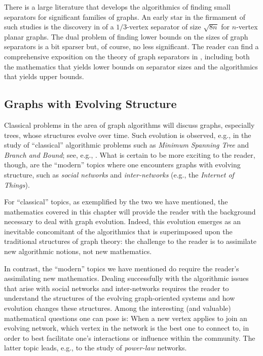\medskip

There is a large literature that develops the algorithmics of finding
small separators for significant families of graphs.  An early star in
the firmament of such studies is the discovery in \cite{LiptonT79} of
a $1/3$-vertex separator of size $\sqrt{8n}$ for $n$-vertex planar graphs.
The dual problem of finding lower bounds on the sizes of graph
separators is a bit sparser but, of course, no less significant.  The
reader can find a comprehensive exposition on the theory of graph
separators in \cite{RosenbergH01}, including both the mathematics that
yields lower bounds on separator sizes and the algorithmics that
yields upper bounds.


\subsection{Graphs with Evolving Structure}
\label{sec:graph-evolve}

Classical problems in the area of graph algorithms will discuss
graphs, especially trees, whose structures evolve over time.  Such
evolution is observed, e.g., in the study of ``classical'' algorithmic
problems such as {\it Minimum Spanning Tree} and {\it Branch and
  Bound}; see, e.g., \cite{CLRS}.  What is certain to be more exciting
to the reader, though, are the ``modern'' topics where one encounters
graphs with evolving structure, such as {\it social networks} and {\it
  inter-networks} (e.g., the {\it Internet of Things}).

For ``classical'' topics, as exemplified by the two we have mentioned,
the mathematics covered in this chapter will provide the reader with
the background necessary to deal with graph evolution.  Indeed, this
evolution emerges as an inevitable concomitant of the algorithmics
that is superimposed upon the traditional structures of graph theory:
the challenge to the reader is to assimilate new algorithmic notions,
not new mathematics.

In contrast, the ``modern'' topics we have mentioned do require the
reader's assimilating new mathematics.  Dealing successfully with the
algorithmic issues that arise with social networks and inter-networks
requires the reader to understand the structures of the evolving
graph-oriented systems and how evolution changes these structures.
Among the interesting (and valuable) mathematical questions one can
pose is: When a new vertex applies to join an evolving network, which
vertex in the network is the best one to connect to, in order to best
facilitate one's interactions or influence within the community.  The
latter topic leads, e.g., to the study of {\em power-law} networks.
\bigskip


